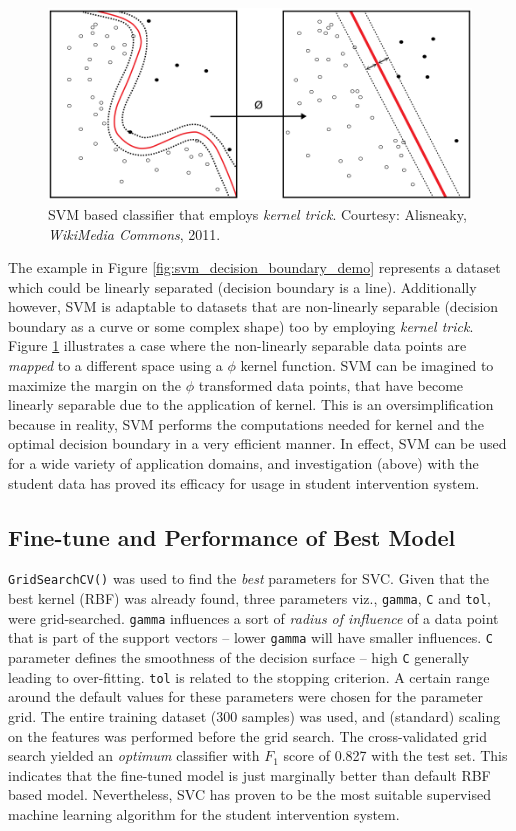 \documentclass{article}
\begin{document}
	\begin{figure}[h]
		\centering
		\includegraphics[scale=0.5]{svm_kernel_trick}
		\caption{SVM based classifier that employs \emph{kernel trick}. Courtesy: Alisneaky, \emph{WikiMedia Commons}, 2011.}
		\label{fig:kernel_trick}
	\end{figure}
	
	The example in Figure \ref{fig:svm_decision_boundary_demo} represents a dataset which could be linearly separated (decision boundary is a line). Additionally however, SVM is adaptable to datasets that are non-linearly separable (decision boundary as a curve or some complex shape) too by employing \emph{kernel trick}. Figure \ref{fig:kernel_trick} illustrates a case where the non-linearly separable data points are \emph{mapped} to a different space using a $\phi$ kernel function. SVM can be imagined to maximize the margin on the $\phi$ transformed data points, that have become linearly separable due to the application of kernel. This is an oversimplification because in reality, SVM performs the computations needed for kernel and the optimal decision boundary in a very efficient manner. In effect, SVM can be used for a wide variety of application domains, and investigation (above) with the student data has proved its efficacy for usage in student intervention system.
	
	\subsection{Fine-tune and Performance of Best Model}
	\texttt{GridSearchCV()} was used to find the \emph{best} parameters for SVC. Given that the best kernel (RBF) was already found, three parameters viz., \texttt{gamma}, \texttt{C} and \texttt{tol}, were grid-searched. \texttt{gamma} influences a sort of \emph{radius of influence} of a data point that is part of the support vectors -- lower \texttt{gamma} will have smaller influences. \texttt{C} parameter defines the smoothness of the decision surface -- high \texttt{C} generally leading to over-fitting. \texttt{tol} is related to the stopping criterion. A certain range around the default values for these parameters were chosen for the parameter grid. The entire training dataset (300 samples) was used, and (standard) scaling on the features was performed before the grid search. The cross-validated grid search yielded an \emph{optimum} classifier with $F_1$ score of 0.827 with the test set. This indicates that the fine-tuned model is just marginally better than default RBF based model. Nevertheless, SVC has proven to be the most suitable supervised machine learning algorithm for the student intervention system.
	
\end{document}
